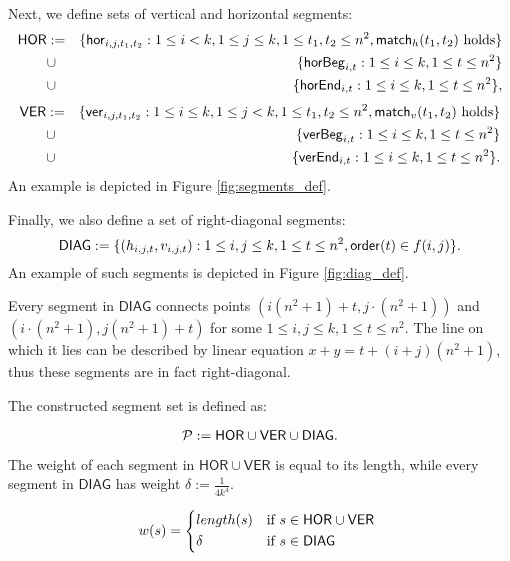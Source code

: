 \newcommand{\allhor}{\mathsf{HOR}}
\newcommand{\allver}{\mathsf{VER}}
\newcommand{\alldiag}{\mathsf{DIAG}}

Next, we define sets of vertical and horizontal segments:
\begin{eqnarray*}
\allhor &:= &\{\hor{i}{j}{t_1}{t_2} : 1 \le i < k, 1 \le j \le k,
1 \le t_1, t_2 \le n^2, \matchh(t_1, t_2) \text{ holds}\} \\
&\cup &\{\horbeg{i}{t} : 1 \le i \le k, 1 \le t \le n^2\}
\\
&\cup &\{\horend{i}{t} : 1 \le i \le k, 1 \le t \le n^2\},
\end{eqnarray*}
\begin{eqnarray*}
\allver &:= &\{\ver{i}{j}{t_1}{t_2} : 1 \le i \le k, 1 \le j < k,
1 \le t_1, t_2 \le n^2, \matchv(t_1, t_2) \text{ holds}\} \\
&\cup &\{\verbeg{i}{t} : 1 \le i \le k, 1 \le t \le n^2\}
\\
&\cup &\{\verend{i}{t} : 1 \le i \le k, 1 \le t \le n^2\}.
\end{eqnarray*}
An example is depicted in Figure \ref{fig:segments_def}.

Finally, we also define a set of right-diagonal segments:
$$\alldiag := \{ (h_{i, j, t}, v_{i, j, t}) :
	1 \le i, j \le k, 1 \le t \le n^2, \order(t) \in f(i, j)\}.$$
An example of such segments is depicted in Figure \ref{fig:diag_def}.



Every segment in $\alldiag$
connects points $(i(n^2+1) + t, j \cdot (n^2+1))$
and ${(i \cdot (n^2+1), j(n^2+1) + t)}$
for some $1 \le i,j \le k, 1 \le t \le n^2$.
The line on which it lies can be described
by linear equation ${x+y=t+(i+j)(n^2+1)}$,
thus these segments are in fact right-diagonal.

The constructed segment set is defined as:

$$\sets := \allhor \cup \allver \cup \alldiag.$$

The weight of each segment in $\allhor \cup \allver$
is equal to its length,
while every segment in $\alldiag$ has weight
$\delta := \frac{1}{4k^4}$.



\begin{equation}
w(s) =
	\begin{cases*}
	  length(s) 			& if $s \in \allhor \cup \allver$ \\
	  \delta        & if $s \in \alldiag$
	\end{cases*}
\end{equation}

